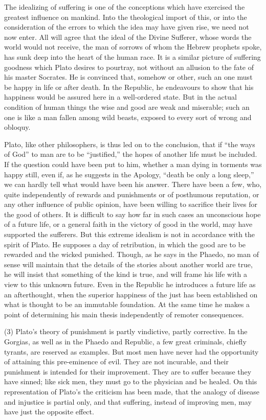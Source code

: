 \documentclass[11pt,letter]{article}
\begin{document}
\par  The idealizing of suffering is one of the conceptions which have exercised the greatest influence on mankind. Into the theological import of this, or into the consideration of the errors to which the idea may have given rise, we need not now enter. All will agree that the ideal of the Divine Sufferer, whose words the world would not receive, the man of sorrows of whom the Hebrew prophets spoke, has sunk deep into the heart of the human race. It is a similar picture of suffering goodness which Plato desires to pourtray, not without an allusion to the fate of his master Socrates. He is convinced that, somehow or other, such an one must be happy in life or after death. In the Republic, he endeavours to show that his happiness would be assured here in a well-ordered state. But in the actual condition of human things the wise and good are weak and miserable; such an one is like a man fallen among wild beasts, exposed to every sort of wrong and obloquy.

\par  Plato, like other philosophers, is thus led on to the conclusion, that if “the ways of God” to man are to be “justified,” the hopes of another life must be included. If the question could have been put to him, whether a man dying in torments was happy still, even if, as he suggests in the Apology, “death be only a long sleep,” we can hardly tell what would have been his answer. There have been a few, who, quite independently of rewards and punishments or of posthumous reputation, or any other influence of public opinion, have been willing to sacrifice their lives for the good of others. It is difficult to say how far in such cases an unconscious hope of a future life, or a general faith in the victory of good in the world, may have supported the sufferers. But this extreme idealism is not in accordance with the spirit of Plato. He supposes a day of retribution, in which the good are to be rewarded and the wicked punished. Though, as he says in the Phaedo, no man of sense will maintain that the details of the stories about another world are true, he will insist that something of the kind is true, and will frame his life with a view to this unknown future. Even in the Republic he introduces a future life as an afterthought, when the superior happiness of the just has been established on what is thought to be an immutable foundation. At the same time he makes a point of determining his main thesis independently of remoter consequences.

\par  (3) Plato’s theory of punishment is partly vindictive, partly corrective. In the Gorgias, as well as in the Phaedo and Republic, a few great criminals, chiefly tyrants, are reserved as examples. But most men have never had the opportunity of attaining this pre-eminence of evil. They are not incurable, and their punishment is intended for their improvement. They are to suffer because they have sinned; like sick men, they must go to the physician and be healed. On this representation of Plato’s the criticism has been made, that the analogy of disease and injustice is partial only, and that suffering, instead of improving men, may have just the opposite effect.
\end{document}
